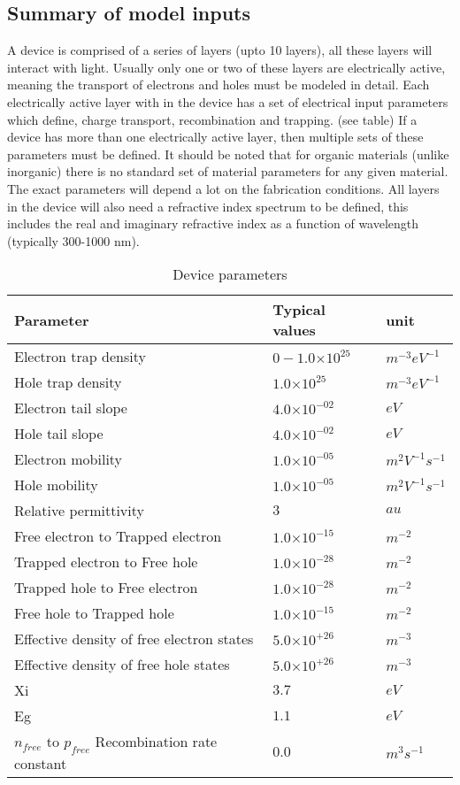 \documentclass[11pt]{article}
\providecommand{\e}[1]{\ensuremath{\times 10^{#1}}}
\begin{document}
\subsection{Summary of model inputs}
A device is comprised of a series of layers (upto 10 layers), all these layers will interact with light.  Usually only one or two of these layers are electrically active, meaning the transport of electrons and holes must be modeled in detail.  Each electrically active layer with in the device has a set of electrical input parameters which define, charge transport, recombination and trapping. (see table)  If a device has more than one electrically active layer, then multiple sets of these parameters must be defined.  It should be noted that for organic materials (unlike inorganic) there is no standard set of material parameters for any given material.  The exact parameters will depend a lot on the fabrication conditions.  All layers in the device will also need a refractive index spectrum to be defined, this includes the real and imaginary refractive index as a function of wavelength (typically 300-1000 nm).
 
\begin{table}[H]
\begin{center}
\begin{tabular}{lll}
\hline
Parameter & Typical values & unit  \\
\hline
Electron trap density & $0-1.0\e{25}$ & $m^{-3} eV^{-1}$ \\
Hole trap density & $1.0\e{25}$ & $m^{-3} eV^{-1}$ \\
Electron tail slope & $4.0\e{-02}$ & $eV$ \\
Hole tail slope & $4.0\e{-02}$ & $eV$ \\
Electron mobility & $1.0\e{-05}$ & $m^{2}V^{-1}s^{-1}$ \\
Hole mobility & $1.0\e{-05}$ & $m^{2}V^{-1}s^{-1}$ \\
Relative permittivity & $3$ & $au$ \\
Free electron to Trapped electron & $1.0\e{-15}$ & $m^{-2}$ \\
Trapped electron to Free hole & $1.0\e{-28}$ & $m^{-2}$ \\
Trapped hole to Free electron & $1.0\e{-28}$ & $m^{-2}$ \\
Free hole to Trapped hole & $1.0\e{-15}$ & $m^{-2}$ \\
Effective density of free electron states & $5.0\e{+26}$ & $m^{-3}$ \\
Effective density of free hole states & $5.0\e{+26}$ & $m^{-3}$ \\
Xi & $3.7$ & $eV$ \\
Eg & $1.1$ & $eV$ \\
$n_{free}$ to $p_{free}$ Recombination rate constant & $0.0$ & $m^{3}s^{-1}$ \\
  \hline
\end{tabular}
\end{center}
\caption{Device parameters}
\end{table}
\end{document}
